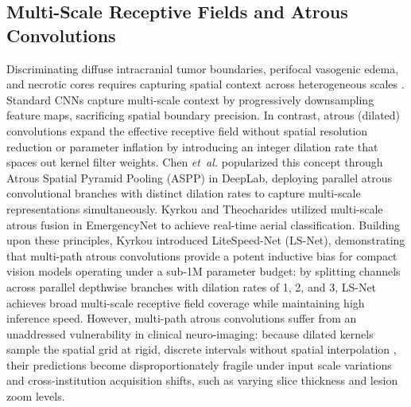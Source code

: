 \subsection{Multi-Scale Receptive Fields and Atrous Convolutions}
Discriminating diffuse intracranial tumor boundaries, perifocal vasogenic edema, and necrotic cores requires capturing spatial context across heterogeneous scales \cite{2, 28, 55}. Standard CNNs capture multi-scale context by progressively downsampling feature maps, sacrificing spatial boundary precision. In contrast, atrous (dilated) convolutions \cite{5} expand the effective receptive field without spatial resolution reduction or parameter inflation by introducing an integer dilation rate that spaces out kernel filter weights. Chen \emph{et~al.} \cite{5} popularized this concept through Atrous Spatial Pyramid Pooling (ASPP) in DeepLab, deploying parallel atrous convolutional branches with distinct dilation rates to capture multi-scale representations simultaneously. Kyrkou and Theocharides \cite{22} utilized multi-scale atrous fusion in EmergencyNet to achieve real-time aerial classification. Building upon these principles, Kyrkou \cite{21} introduced LiteSpeed-Net (LS-Net), demonstrating that multi-path atrous convolutions provide a potent inductive bias for compact vision models operating under a sub-1M parameter budget: by splitting channels across parallel depthwise branches with dilation rates of 1, 2, and 3, LS-Net achieves broad multi-scale receptive field coverage while maintaining high inference speed. However, multi-path atrous convolutions suffer from an unaddressed vulnerability in clinical neuro-imaging: because dilated kernels sample the spatial grid at rigid, discrete intervals without spatial interpolation \cite{5, 21}, their predictions become disproportionately fragile under input scale variations and cross-institution acquisition shifts, such as varying slice thickness and lesion zoom levels.

